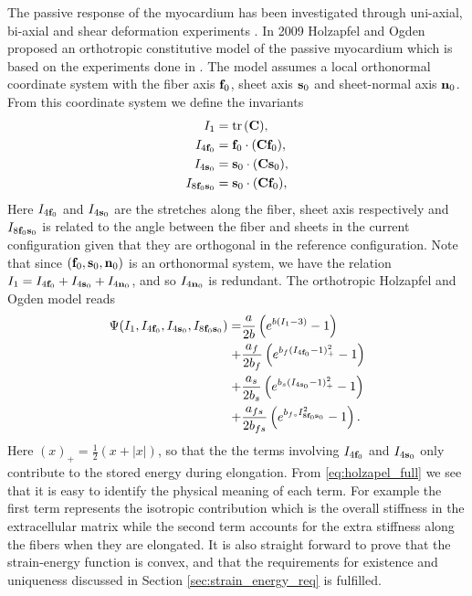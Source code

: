 The passive response of the myocardium has been investigated through
uni-axial, bi-axial and shear deformation experiments \cite{dokos2002shear}.
In 2009 Holzapfel and Ogden proposed an orthotropic constitutive model
of the passive myocardium \cite{holzapfel2009constitutive} which is
based on the experiments done in \cite{dokos2002shear}. The model
assumes a local orthonormal coordinate system with the fiber axis
$\mathbf{f}_0$, sheet axis $\mathbf{s}_0$ and sheet-normal axis $\mathbf{n}_0$. %
From this coordinate system we define the invariants
\begin{align}
  \begin{split}
    I_1 &= \mathrm{tr} \hspace{0.05cm}(\mathbf{C}) ,\\
    I_{4\mathbf{f}_0} &= \mathbf{f}_0 \cdot (\mathbf{C} \mathbf{f}_0),\\
    I_{4\mathbf{s}_0} &= \mathbf{s}_0 \cdot (\mathbf{C} \mathbf{s}_0),\\
    I_{8\mathbf{f}_0\mathbf{s}_0} &=  \mathbf{s}_0 \cdot (\mathbf{C} \mathbf{f}_0), 
  \end{split}
\end{align}
Here $I_{4\mathbf{f}_0} $ and $I_{4\mathbf{s}_0}$ are the stretches along the
fiber, sheet axis respectively and $I_{8\mathbf{f}_0\mathbf{s}_0}$ is
related to the angle between the fiber and sheets in the current
configuration given that they are orthogonal in the reference
configuration. Note that since $(\mathbf{f}_0, \mathbf{s}_0, \mathbf{n}_0)$ is an orthonormal
system, we have the relation $I_1 = I_{4\mathbf{f}_0} + I_{4\mathbf{s}_0} +I_{4\mathbf{n}_0}$,
and so $I_{4\mathbf{n}_0}$ is redundant. The orthotropic Holzapfel and Ogden
model reads
\begin{align}
  \label{eq:holzapel_full}
  \begin{split}
  \Psi(I_1, I_{4\mathbf{f}_0},  I_{4\mathbf{s}_0},  I_{8\mathbf{f}_0\mathbf{s}_0}) =& \frac{a}{2 b} \left( e^{ b (I_1 - 3)}  -1 \right)\\
  +& \frac{a_f}{2 b_f} \left( e^{ b_f (I_{4\mathbf{f}_0} - 1)_+^2} -1 \right) \\
  +& \frac{a_s}{2 b_s} \left( e^{ b_s (I_{4\mathbf{s}_0} - 1)_+^2} -1 \right)\\
  +& \frac{a_{fs}}{2 b_{fs}} \left( e^{ b_{fs} I_{8\mathbf{f}_0\mathbf{s}_0}^2} -1 \right).
\end{split}
\end{align}
Here $( x )_+ = \frac{1}{2} \left( x + |x| \right)$, so that the
the terms involving $I_{4\mathbf{f}_0}$ and $I_{4\mathbf{s}_0}$ only contribute to the
stored energy during elongation. From \eqref{eq:holzapel_full} we see
that it is easy to identify the physical meaning of each term. For
example the first term represents the isotropic contribution which is
the overall stiffness in the extracellular matrix while the second
term accounts for the extra stiffness along the fibers when they are
elongated. It is also straight forward to prove that the strain-energy
function is convex, and that the requirements for existence and
uniqueness discussed in Section \ref{sec:strain_energy_req} is
fulfilled.

